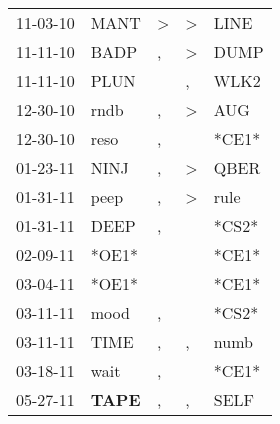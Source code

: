 \begin{supertabular}{p{0.07\textwidth}p{0.06\textwidth}p{0.02\textwidth}p{0.02\textwidth}p{0.06\textwidth}}
          11-03-10\textsuperscript{} &           MANT\textsuperscript{} &     \textgreater &     \textgreater &           LINE\textsuperscript{} \\
          11-11-10\textsuperscript{} &           BADP\textsuperscript{} &                , &     \textgreater &           DUMP\textsuperscript{} \\
          11-11-10\textsuperscript{} &           PLUN\textsuperscript{} &                  &                , &           WLK2\textsuperscript{} \\
          12-30-10\textsuperscript{} &           rndb\textsuperscript{} &                , &     \textgreater &            AUG\textsuperscript{} \\
          12-30-10\textsuperscript{} &           reso\textsuperscript{} &                , &                  &                            *CE1* \\
          01-23-11\textsuperscript{} &           NINJ\textsuperscript{} &                , &     \textgreater &           QBER\textsuperscript{} \\
          01-31-11\textsuperscript{} &           peep\textsuperscript{} &                , &     \textgreater &           rule\textsuperscript{} \\
          01-31-11\textsuperscript{} &           DEEP\textsuperscript{} &                , &                  &                            *CS2* \\
          02-09-11\textsuperscript{} &                            *OE1* &                  &                  &                            *CE1* \\
          03-04-11\textsuperscript{} &                            *OE1* &                  &                  &                            *CE1* \\
          03-11-11\textsuperscript{} &           mood\textsuperscript{} &                , &                  &                            *CS2* \\
          03-11-11\textsuperscript{} &           TIME\textsuperscript{} &                , &                , &           numb\textsuperscript{} \\
          03-18-11\textsuperscript{} &           wait\textsuperscript{} &                , &                  &                            *CE1* \\
          05-27-11\textsuperscript{} &  \textbf{TAPE\textsuperscript{}} &                , &                , &           SELF\textsuperscript{} \\

\end{supertabular}
